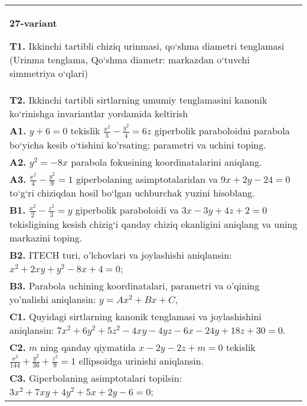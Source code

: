 \documentclass{article}
\begin{document}
\begin{tabular}{m{17cm}}
\textbf{27-variant}
\newline

\textbf{T1.} Ikkinchi tartibli chiziq urinmasi, qo‘shma diametri tenglamasi (Urinma tenglama, Qo‘shma diametr: markazdan o‘tuvchi simmetriya o‘qlari) \\
\textbf{T2.} Ikkinchi tartibli sirtlarning umumiy tenglamasini kanonik ko‘rinishga invariantlar yordamida keltirish \\
\textbf{A1.} $y+6=0$ tekislik $\frac{x^2}{5}-\frac{y^2}{4}=6 z$ giperbolik paraboloidni parabola bo‘yicha kesib o‘tishini ko'rsating; parametri va uchini toping. \\
\textbf{A2.} $y^2=-8 x$ parabola fokusining koordinatalarini aniqlang. \\
\textbf{A3.} $\frac{x^2}{4}-\frac{y^2}{9}=1$ giperbolaning asimptotalaridan va $9 x+2 y-24=0$ to‘g‘ri chiziqdan hosil bo‘lgan uchburchak yuzini hisoblang. \\
\textbf{B1.} $\frac{x^2}{2}-\frac{z^2}{3}=y$ giperbolik paraboloidi va $3x-3y+4z+2=0$ tekisligining kesish chizig‘i qanday chiziq ekanligini aniqlang va uning markazini toping. \\
\textbf{B2.} ITECH turi, o'lchovlari va joylashishi aniqlansin: $x^2+2 x y+y^2-8 x+4=0$; \\
\textbf{B3.} Parabola uchining koordinatalari, parametri va o'qining yo'nalishi aniqlansin: $y=A x^2+B x+C$, \\
\textbf{C1.} Quyidagi sirtlarning kanonik tenglamasi va joylashishini aniqlansin: $7 x^2+6 y^2+5 z^2-4 x y-4 y z-6 x-24 y+18 z+30=0$. \\
\textbf{C2.} $m$ ning qanday qiymatida $x-2 y-2 z+m=0$ tekislik $\frac{x^2}{144}+\frac{y^2}{36}+\frac{z^2}{9}=1$ ellipsoidga urinishi aniqlansin. \\
\textbf{C3.} Giperbolaning asimptotalari topilsin: $3 x^2+7 x y+4 y^2+5 x+2 y-6=0$; \\

\end{tabular}
\vspace{1cm}
\end{document}
